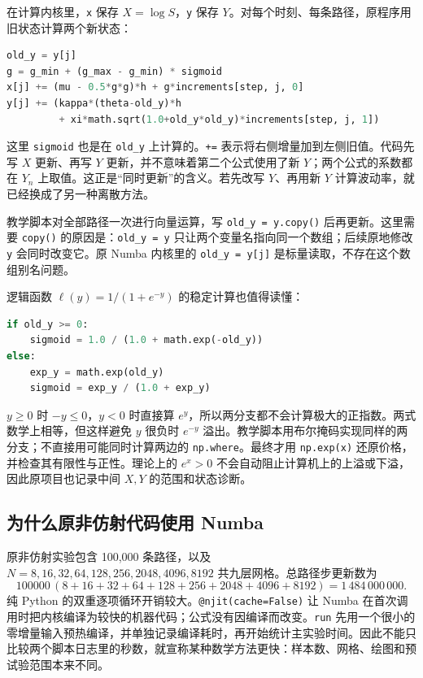 在计算内核里，\texttt{x} 保存 $X=\log S$，\texttt{y} 保存 $Y$。对每个时刻、每条路径，原程序用旧状态计算两个新状态：
\begin{lstlisting}[language=Python]
old_y = y[j]
g = g_min + (g_max - g_min) * sigmoid
x[j] += (mu - 0.5*g*g)*h + g*increments[step, j, 0]
y[j] += (kappa*(theta-old_y)*h
         + xi*math.sqrt(1.0+old_y*old_y)*increments[step, j, 1])
\end{lstlisting}
这里 \texttt{sigmoid} 也是在 \texttt{old\_y} 上计算的。\texttt{+=} 表示将右侧增量加到左侧旧值。代码先写 $X$ 更新、再写 $Y$ 更新，并不意味着第二个公式使用了新 $Y$；两个公式的系数都在 $Y_n$ 上取值。这正是“同时更新”的含义。若先改写 $Y$、再用新 $Y$ 计算波动率，就已经换成了另一种离散方法。

教学脚本对全部路径一次进行向量运算，写 \texttt{old\_y = y.copy()} 后再更新。这里需要 \texttt{copy()} 的原因是：\texttt{old\_y = y} 只让两个变量名指向同一个数组；后续原地修改 \texttt{y} 会同时改变它。原 Numba 内核里的 \texttt{old\_y = y[j]} 是标量读取，不存在这个数组别名问题。

逻辑函数 $\ell(y)=1/(1+e^{-y})$ 的稳定计算也值得读懂：
\begin{lstlisting}[language=Python]
if old_y >= 0:
    sigmoid = 1.0 / (1.0 + math.exp(-old_y))
else:
    exp_y = math.exp(old_y)
    sigmoid = exp_y / (1.0 + exp_y)
\end{lstlisting}
$y\geq0$ 时 $-y\leq0$，$y<0$ 时直接算 $e^y$，所以两分支都不会计算极大的正指数。两式数学上相等，但这样避免 $y$ 很负时 $e^{-y}$ 溢出。教学脚本用布尔掩码实现同样的两分支；不直接用可能同时计算两边的 \texttt{np.where}。最终才用 \texttt{np.exp(x)} 还原价格，并检查其有限性与正性。理论上的 $e^x>0$ 不会自动阻止计算机上的上溢或下溢，因此原项目也记录中间 $X,Y$ 的范围和状态诊断。

\subsection{为什么原非仿射代码使用 Numba}

原非仿射实验包含 100,000 条路径，以及 $N=8,16,32,64,128,256,2048,4096,8192$ 共九层网格。总路径步更新数为
\[
100000\,(8+16+32+64+128+256+2048+4096+8192)
=1\,484\,000\,000.
\]
纯 Python 的双重逐项循环开销较大。\texttt{@njit(cache=False)} 让 Numba 在首次调用时把内核编译为较快的机器代码；公式没有因编译而改变。\texttt{run} 先用一个很小的零增量输入预热编译，并单独记录编译耗时，再开始统计主实验时间。因此不能只比较两个脚本日志里的秒数，就宣称某种数学方法更快：样本数、网格、绘图和预试验范围本来不同。

